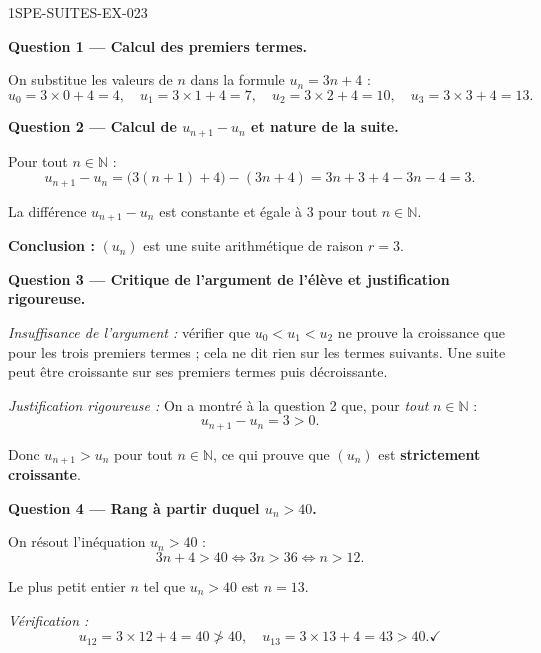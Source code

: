 \begin{corrige}{1SPE-SUITES-EX-023}

\textbf{Question 1 — Calcul des premiers termes.}

On substitue les valeurs de $n$ dans la formule $u_n = 3n + 4$ :
\[
  u_0 = 3 \times 0 + 4 = 4, \quad
  u_1 = 3 \times 1 + 4 = 7, \quad
  u_2 = 3 \times 2 + 4 = 10, \quad
  u_3 = 3 \times 3 + 4 = 13.
\]

\medskip
\textbf{Question 2 — Calcul de $u_{n+1} - u_n$ et nature de la suite.}

Pour tout $n \in \mathbb{N}$ :
\[
  u_{n+1} - u_n = \bigl(3(n+1) + 4\bigr) - (3n + 4) = 3n + 3 + 4 - 3n - 4 = 3.
\]


La différence $u_{n+1} - u_n$ est constante et égale à $3$ pour tout $n \in \mathbb{N}$.

\textbf{Conclusion :} $(u_n)$ est une suite arithmétique de raison $r = 3$.

\medskip
\textbf{Question 3 — Critique de l'argument de l'élève et justification rigoureuse.}

\textit{Insuffisance de l'argument :} vérifier que $u_0 < u_1 < u_2$ ne prouve la croissance que pour les trois premiers termes ; cela ne dit rien sur les termes suivants. Une suite peut être croissante sur ses premiers termes puis décroissante.

\textit{Justification rigoureuse :} On a montré à la question 2 que, pour \emph{tout} $n \in \mathbb{N}$ :
\[
  u_{n+1} - u_n = 3 > 0.
\]


Donc $u_{n+1} > u_n$ pour tout $n \in \mathbb{N}$, ce qui prouve que $(u_n)$ est \textbf{strictement croissante}.

\medskip
\textbf{Question 4 — Rang à partir duquel $u_n > 40$.}

On résout l'inéquation $u_n > 40$ :
\[
  3n + 4 > 40 \iff 3n > 36 \iff n > 12.
\]


Le plus petit entier $n$ tel que $u_n > 40$ est $n = 13$.

\textit{Vérification :}
\[
  u_{12} = 3 \times 12 + 4 = 40 \not> 40, \quad u_{13} = 3 \times 13 + 4 = 43 > 40. \checkmark
\]

\end{corrige}
